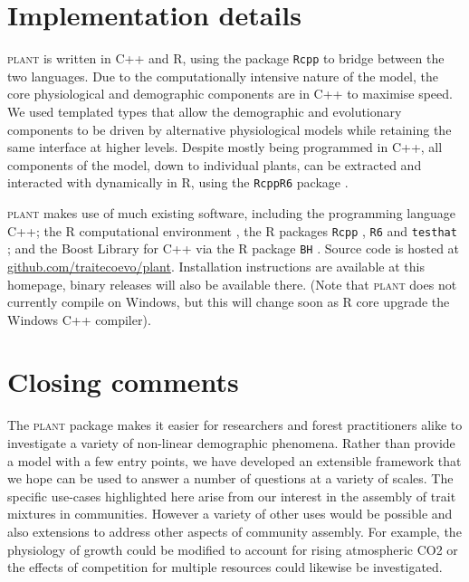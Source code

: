 \documentclass[a4paper,11pt]{article}
\newcommand{\plant}{\textsc{plant}}
\begin{document}
\section{Implementation details}

{\plant} is written in C++ and R, using the package \texttt{Rcpp}
\citep{Eddelbuettel-2011, Eddelbuettel-2013} to bridge between the two
languages. Due to the computationally intensive nature of the model, the
core physiological and demographic components are in C++ to maximise
speed. We used templated types that allow the demographic and evolutionary
components to be driven by alternative physiological models while
retaining the same interface at higher levels. Despite mostly being
programmed in C++, all components of the model, down to individual
plants, can be extracted and interacted with dynamically in R, using the
\texttt{RcppR6} package \citep{RcppR6}.

{\plant} makes use of much existing software, including the programming
language C++; the R computational environment \citep{R-2015}, the R
packages \texttt{Rcpp} \citep{Eddelbuettel-2011, Eddelbuettel-2013},
\texttt{R6} \citep{Chang-2014} and \texttt{testhat}
\citep{Wickham-2011}; and the Boost Library for C++
\citep{Schaling-2014} via the R package \texttt{BH}
\citep{Eddelbuettel-2015}. Source code is hosted at
\href{https://github.com/traitecoevo/plant}{github.com/traitecoevo/plant}.
Installation instructions are available at this homepage, binary
releases will also be available there.  (Note that {\plant} does not
currently compile on Windows, but this will change soon as R core
upgrade the Windows C++ compiler).

\section{Closing comments}

The {\plant} package makes it easier for researchers and forest practitioners
alike to investigate a variety of non-linear demographic phenomena.  Rather
than provide a model with a few entry points, we have developed an extensible
framework that we hope can be used to answer a number of questions at a
variety of scales. The specific use-cases highlighted here arise from our
interest in the assembly of trait mixtures in communities. However a variety
of other uses would be possible and also extensions to address other aspects
of community assembly. For example,  the physiology of growth could be
modified to account for rising atmospheric CO2 or the effects of competition
for multiple resources could likewise be investigated.
\end{document}
